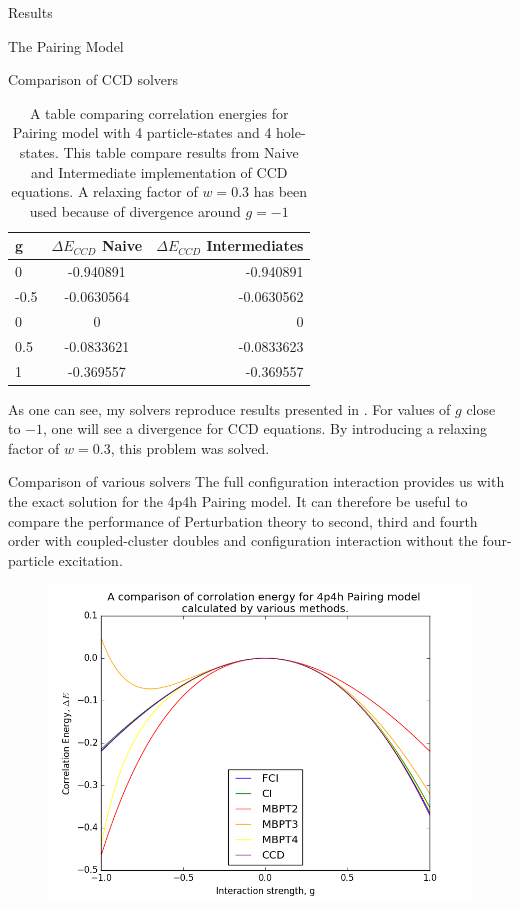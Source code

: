 \documentclass[twoside,english]{uiofysmaster}
\begin{document}
\begin{chapter}{Results}
\begin{section}{The Pairing Model}
\begin{subsection}{Comparison of CCD solvers}
			\begin{table}[H]
				\begin{center}
					\begin{tabular}[center]{l | c | r}
						g & $ \Delta E_{CCD}$ Naive  & $\Delta E_{CCD}$ Intermediates \\
						\hline
						0 & -0.940891 & -0.940891 \\
						-0.5 & -0.0630564 & -0.0630562 \\
						0 & 0 & 0 \\
						0.5 & -0.0833621 & -0.0833623 \\
						1 & -0.369557 & -0.369557
					\end{tabular}
				\end{center}
				\caption{A table comparing correlation energies for Pairing model with 4 particle-states and 4 hole-states. This table compare results from Naive and Intermediate implementation of CCD equations. A relaxing factor of $w = 0.3$ has been used because of divergence around $g=-1$}
				\label{Results3}
			\end{table}
			As one can see, my solvers reproduce results presented in \cite{Hjorth-Jensen2016}. For values of $g$ close to $-1$, one will see a divergence for CCD equations. By introducing a relaxing factor of $w = 0.3$, this problem was solved. 
		\end{subsection}
		\newpage
		\begin{subsection}{Comparison of various solvers}
			The full configuration interaction provides us with the exact solution for the 4p4h Pairing model. It can therefore be useful to compare the performance of Perturbation theory to second, third and fourth order with coupled-cluster doubles and configuration interaction without the four-particle excitation. 
			\begin{figure}[H]
				\includegraphics[width=\linewidth]{../Pairing_Model/Results/Figures/Pairing4p4h_CompareDE_AllMethods.png}

\end{figure}
\end{subsection}
\end{section}
\end{chapter}
\end{document}
